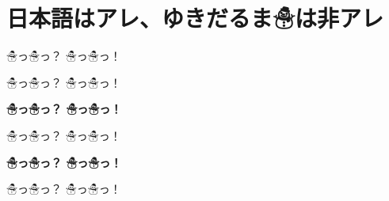 \documentclass[uplatex,dvipdfmx,a4paper]{jsarticle}
\begin{document}
\section{日本語はアレ、ゆきだるま☃は非アレ}
\mcfamily\ltseries ☃っ☃っ？ {\propshape ☃っ☃っ}！\par
\mcfamily\mdseries ☃っ☃っ？ {\propshape ☃っ☃っ}！\par
\mcfamily\bfseries ☃っ☃っ？ {\propshape ☃っ☃っ}！\par
\gtfamily\mdseries ☃っ☃っ？ {\propshape ☃っ☃っ}！\par
\gtfamily\bfseries ☃っ☃っ？ {\propshape ☃っ☃っ}！\par
\gtfamily\ebseries ☃っ☃っ？ {\propshape ☃っ☃っ}！\par
\end{document}
